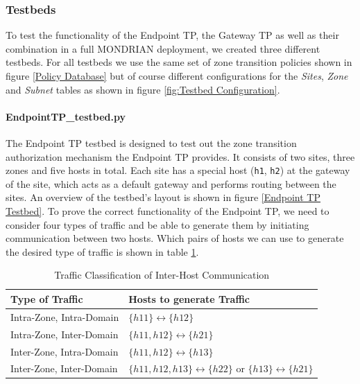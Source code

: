 \subsubsection{Testbeds}
To test the functionality of the Endpoint \acs{TP}, the Gateway \acs{TP} as well as their combination in a full MONDRIAN deployment, we created three different testbeds. For all testbeds we use the same set of zone transition policies shown in figure \ref{Policy Database} but of course different configurations for the \textit{Sites}, \textit{Zone} and \textit{Subnet} tables as shown in figure \ref{fig:Testbed Configuration}.
\paragraph{EndpointTP\_testbed.py} The Endpoint \acs{TP} testbed is designed to test out the zone transition authorization mechanism the Endpoint \acs{TP} provides. It consists of two sites, three zones and five hosts in total. Each site has a special host (\texttt{h1}, \texttt{h2}) at the gateway of the site, which acts as a default gateway and performs routing between the sites. An overview of the testbed's layout is shown in figure \ref{Endpoint TP Testbed}. To prove the correct functionality of the Endpoint \acs{TP}, we need to consider four types of traffic and be able to generate them by initiating communication between two hosts. Which pairs of hosts we can use to generate the desired type of traffic is shown in table \ref{Types of Traffic}.

\begin{table}[t]
\centering
\begin{tabular}{@{}p{}p{}@{}}\toprule
    \textbf{Type of Traffic} & \textbf{Hosts to generate Traffic} \\\midrule
    Intra-Zone, Intra-Domain & $\{h11\}\leftrightarrow \{h12\}$\\ 
    Intra-Zone, Inter-Domain & $\{h11, h12\}\leftrightarrow \{h21\}$\\
    Inter-Zone, Intra-Domain & $\{h11, h12\}\leftrightarrow \{h13\}$\\
    Inter-Zone, Inter-Domain & $\{h11, h12, h13\}\leftrightarrow \{h22\}$ or $\{h13\}\leftrightarrow \{h21\}$\\
    \bottomrule
\end{tabular}
    \caption{Traffic Classification of Inter-Host Communication}
    \label{Types of Traffic}
\end{table}


